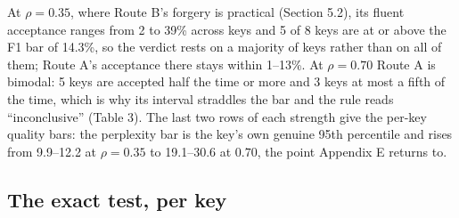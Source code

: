\documentclass[11pt,letterpaper]{article}
\begin{document}
At \(\rho = 0.35\), where Route B's forgery is practical (Section 5.2), its fluent acceptance ranges from 2 to 39\% across keys and 5 of 8 keys are at or above the F1 bar of 14.3\%, so the verdict rests on a majority of keys rather than on all of them; Route A's acceptance there stays within 1--13\%. At \(\rho = 0.70\) Route A is bimodal: 5 keys are accepted half the time or more and 3 keys at most a fifth of the time, which is why its interval straddles the bar and the rule reads ``inconclusive'' (Table 3). The last two rows of each strength give the per-key quality bars: the perplexity bar is the key's own genuine 95th percentile and rises from 9.9--12.2 at \(\rho = 0.35\) to 19.1--30.6 at \(0.70\), the point Appendix E returns to.

\hypertarget{the-exact-test-per-key}{%
\subsection{The exact test, per key}\label{the-exact-test-per-key}}
\end{document}
